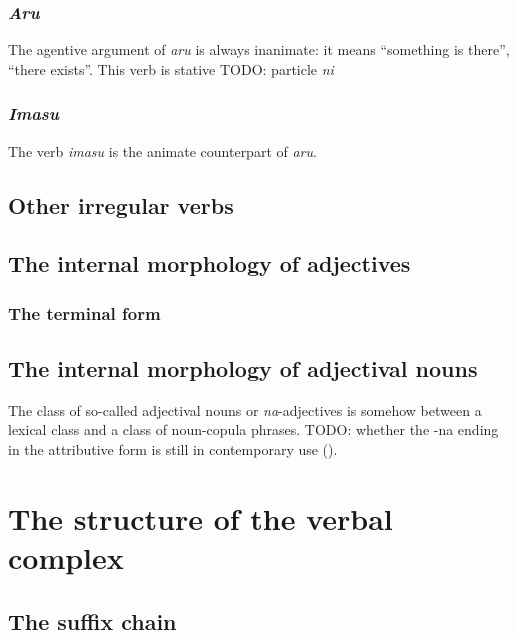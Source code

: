 \documentclass[UTF8, a4paper, oneside, scheme=plain]{ctexrep}
\newcommand{\corpus}[1]{\emph{#1}}
\begin{document}
\subsubsection{\corpus{Aru}}\label{sec:aru}

The agentive argument of \corpus{aru} is always inanimate:
it means ``something is there'', ``there exists''.
This verb is stative TODO: particle \corpus{ni} 

\subsubsection{\corpus{Imasu}}\label{sec:imasu}

The verb \corpus{imasu} is the animate counterpart of \corpus{aru}. 

\subsection{Other irregular verbs}

\subsection{The internal morphology of adjectives}\label{sec:adjective-internal-form}

\subsubsection{The terminal form}\label{sec:adjective-terminal-form}

\subsection{The internal morphology of adjectival nouns}\label{sec:adjectival-noun-internal-form}

The class of so-called adjectival nouns or \corpus{na}-adjectives 
is somehow between a lexical class and a class of noun-copula phrases.
TODO: whether the -na ending in the attributive form is still in contemporary use ().

\section{The structure of the verbal complex}\label{sec:verbal-complex-overview}

\subsection{The suffix chain}\label{sec:suffix-chain}
\end{document}
